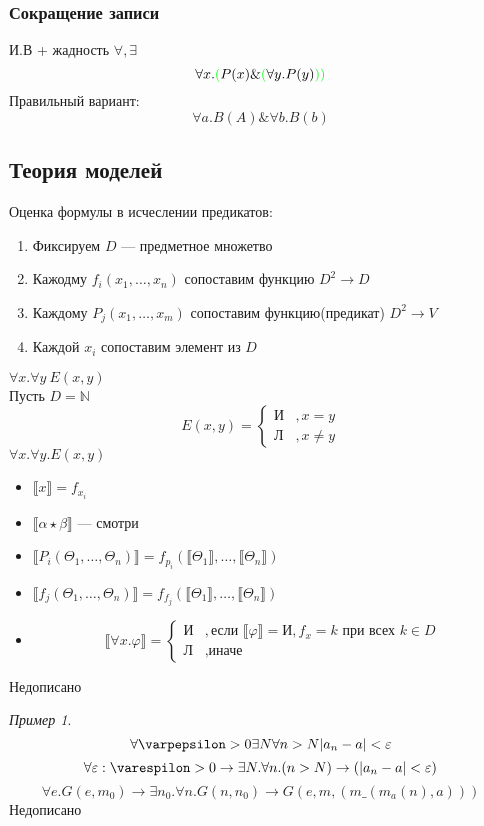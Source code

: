 \documentclass[english]{article}
\newcommand{\N}{\mathbb{N}}
\theoremstyle{plain}
\theoremstyle{remark}
\newtheorem*{examp}{Пример}
\theoremstyle{definition}
\begin{document}
\subsubsection{Сокращение записи}
\label{sec:org3350d3d}
И.В + жадность \(\forall, \exists\)
\[ \forall x. \color{green}(\color{black}P(x) \& \color{green}(\color{black}\forall y. P(y) \color{green}))\color{black} \]
Правильный вариант:
\[ \forall a. B(A) \& \forall b. B(b) \]
\subsection{Теория моделей}
\label{sec:org7ee4210}
Оценка формулы в исчеслении предикатов:
\begin{enumerate}
\item Фиксируем \(D\) --- предметное множетво
\item Кажодму \(f_i(x_1, \dots, x_n)\) сопоставим функцию \(D^2 \to D\)
\item Каждому \(P_j(x_1, \dots, x_m)\) сопоставим функцию(предикат) \(D^2 \to V\)
\item Каждой \(x_i\) сопоставим элемент из \(D\)
\end{enumerate}
\(\forall x.\forall y\ E(x, y)\) \\
Пусть \(D = \N\)
\[ E(x, y) = \begin{cases}\text{И} & ,x = y \\ \text{Л} &, x\neq y\end{cases} \]
\(\forall x.\forall y. E(x, y)\)
\begin{itemize}
\item \(\llbracket x \rrbracket = f_{x_i}\)
\item \(\llbracket \alpha \star \beta \rrbracket\) --- смотри
\item \(\llbracket P_i(\Theta_1, \dots , \Theta_n) \rrbracket = f_{p_i}(\llbracket \Theta_1 \rrbracket, \dots, \llbracket \Theta_n \rrbracket)\)
\item \(\llbracket f_j(\Theta_1 , \dots, \Theta_n ) \rrbracket = f_{f_j}(\llbracket \Theta_1 \rrbracket, \dots, \llbracket \Theta_n \rrbracket)\)
\item \[ \llbracket \forall x. \varphi \rrbracket = \begin{cases} \text{И} & , \text{если } \llbracket \varphi \rrbracket = \text{И}, f_x = k\text{ при всех } k \in D \\ \text{Л} &,\text{иначе}\end{cases} \]
\end{itemize}
\color{red}Недописано\color{black}
\begin{examp}
\[ \forall \varpepsilon > 0 \exists N \forall n > N |a_n - a| < \varepsilon \]
\[ \forall \varepsilon: \varespilon > 0 \to \exists N. \forall n. (n > N) \to (|a_n - a| < \varepsilon) \]
\[ \forall e. G(e, m_0) \to \exists n_0.\forall n. G(n, n_0)\to G(e, m, (m\_ (m_a(n), a))) \]
\color{red}Недописано\color{black}
\end{examp}
\end{document}
